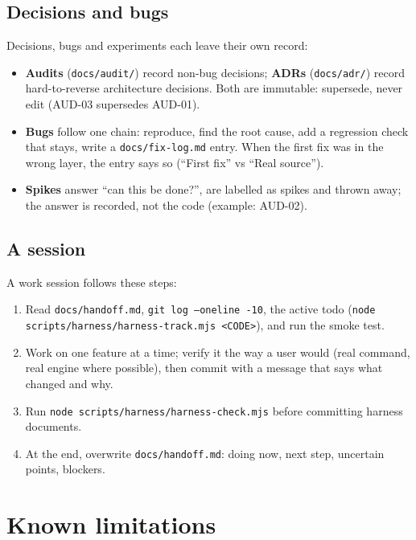 \documentclass[11pt,a4paper]{article}
\newcommand{\code}[1]{\texttt{#1}}
\newcommand{\file}[1]{\texttt{#1}}
\begin{document}
\subsection{Decisions and bugs}

Decisions, bugs and experiments each leave their own record:

\begin{itemize}
  \item \textbf{Audits} (\file{docs/audit/}) record non-bug decisions; \textbf{ADRs}
        (\file{docs/adr/}) record hard-to-reverse architecture decisions. Both are immutable:
        supersede, never edit (AUD-03 supersedes AUD-01).
  \item \textbf{Bugs} follow one chain: reproduce, find the root cause, add a regression check that
        stays, write a \file{docs/fix-log.md} entry. When the first fix was in the wrong layer, the
        entry says so (``First fix'' vs ``Real source'').
  \item \textbf{Spikes} answer ``can this be done?'', are labelled as spikes and thrown away; the
        answer is recorded, not the code (example: AUD-02).
\end{itemize}

\subsection{A session}

A work session follows these steps:

\begin{enumerate}\raggedright
  \item Read \file{docs/handoff.md}, \code{git log --oneline -10}, the active todo
        (\code{node scripts/harness/harness-track.mjs <CODE>}), and run the smoke test.
  \item Work on one feature at a time; verify it the way a user would (real command, real engine
        where possible), then commit with a message that says what changed and why.
  \item Run \code{node scripts/harness/harness-check.mjs} before committing harness documents.
  \item At the end, overwrite \file{docs/handoff.md}: doing now, next step, uncertain points,
        blockers.
\end{enumerate}

\section{Known limitations}\label{sec:limits}
\end{document}
